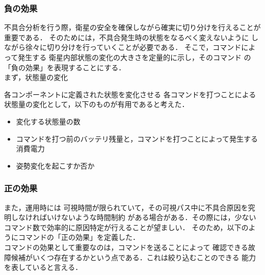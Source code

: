 \documentclass[11pt]{article}
\begin{document}
\subsubsection{負の効果}
不具合分析を行う際，衛星の安全を確保しながら確実に切り分けを行えることが
重要である．
そのためには，不具合発生時の状態をなるべく変えないように
しながら徐々に切り分けを行っていくことが必要である．
そこで，コマンドによって発生する
衛星内部状態の変化の大きさを定量的に示し，そのコマンド
の「負の効果」を表現することにする．\\
まず，状態量の変化

各コンポーネントに定義された状態を変化させる
各コマンドを打つことによる状態量の変化として，以下のものが有用であると考えた．
\begin{itemize}
   \item 変化する状態量の数
   \item コマンドを打つ前のバッテリ残量と，コマンドを打つことによって発生する消費電力
   \item 姿勢変化を起こすか否か
\end{itemize}

\subsubsection{正の効果}

また，運用時には
可視時間が限られていて，その可視パス中に不具合原因を究明しなければいけないような時間制約
がある場合がある．その際には，少ないコマンド数で効率的に原因特定が行えることが望ましい．
そのため，以下のようにコマンドの「正の効果」を定義した．\\
コマンドの効果として重要なのは，コマンドを送ることによって
確認できる故障候補がいくつ存在するかという点である．これは絞り込むことのできる
能力を表していると言える．
\end{document}
